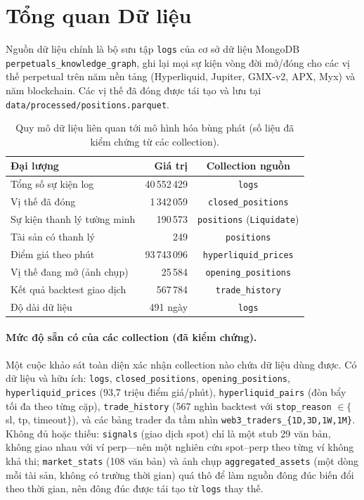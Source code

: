 \documentclass[11pt,a4paper]{article}
\begin{document}
\section{Tổng quan Dữ liệu}

Nguồn dữ liệu chính là bộ sưu tập \texttt{logs} của cơ sở dữ liệu MongoDB \texttt{perpetuals\_knowledge\_graph}, ghi lại mọi sự kiện vòng đời mở/đóng cho các vị thế perpetual trên năm nền tảng (Hyperliquid, Jupiter, GMX-v2, APX, Myx) và năm blockchain. Các vị thế đã đóng được tái tạo và lưu tại \texttt{data/processed/positions.parquet}.

\begin{table}[ht]
\centering
\caption{Quy mô dữ liệu liên quan tới mô hình hóa bùng phát (số liệu đã kiểm chứng từ các collection).}
\label{tab:scale}
\begin{tabular}{lrc}
\toprule
Đại lượng & Giá trị & Collection nguồn \\
\midrule
Tổng số sự kiện log            & 40\,552\,429 & \texttt{logs} \\
Vị thế đã đóng            & 1\,342\,059  & \texttt{closed\_positions} \\
Sự kiện thanh lý tường minh & 190\,573     & \texttt{positions} (\texttt{Liquidate}) \\
Tài sản có thanh lý    & 249          & \texttt{positions} \\
Điểm giá theo phút    & 93\,743\,096 & \texttt{hyperliquid\_prices} \\
Vị thế đang mở (ảnh chụp)   & 25\,584      & \texttt{opening\_positions} \\
Kết quả backtest giao dịch   & 567\,784     & \texttt{trade\_history} \\
Độ dài dữ liệu                   & 491 ngày     & \texttt{logs} \\
\bottomrule
\end{tabular}
\end{table}

\paragraph{Mức độ sẵn có của các collection (đã kiểm chứng).} Một cuộc khảo sát toàn diện xác nhận collection nào chứa dữ liệu dùng được. Có dữ liệu và hữu ích: \texttt{logs}, \texttt{closed\_positions}, \texttt{opening\_positions}, \texttt{hyperliquid\_prices} (93,7 triệu điểm giá/phút), \texttt{hyperliquid\_pairs} (đòn bẩy tối đa theo từng cặp), \texttt{trade\_history} (567 nghìn backtest với \texttt{stop\_reason} $\in\{$sl, tp, timeout$\}$), và các bảng trader đa tầm nhìn \texttt{web3\_traders\_\{1D,3D,1W,1M\}}. Không đủ hoặc thiếu: \texttt{signals} (giao dịch spot) chỉ là một stub 29 văn bản, không giao nhau với ví perp---nên một nghiên cứu spot--perp theo từng ví không khả thi; \texttt{market\_stats} (108 văn bản) và ảnh chụp \texttt{aggregated\_assets} (một dòng mỗi tài sản, không có trường thời gian) quá thô để làm nguồn đông đúc biến đổi theo thời gian, nên đông đúc được tái tạo từ \texttt{logs} thay thế.
\end{document}
